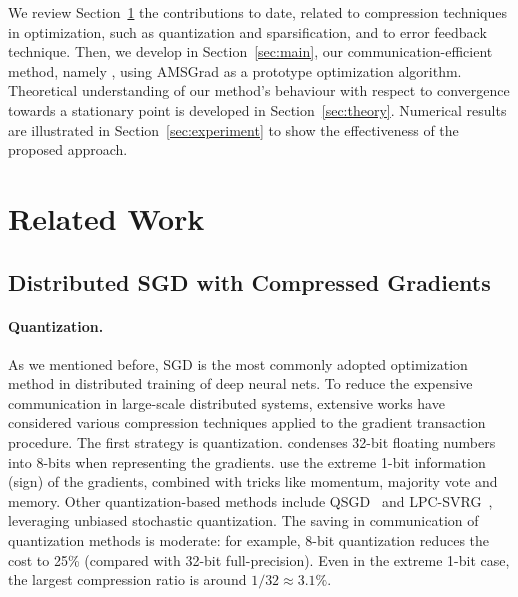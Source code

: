 \documentclass[11pt]{article}
\begin{document}
We review Section~\ref{sec:related} the contributions to date, related to compression techniques in optimization, such as quantization and sparsification, and to error feedback technique.
Then, we develop in Section~\ref{sec:main}, our communication-efficient method, namely \algo, using AMSGrad as a prototype optimization algorithm.
Theoretical understanding of our method's behaviour with respect to convergence towards a stationary point is developed in Section~\ref{sec:theory}.
Numerical results are illustrated in Section~\ref{sec:experiment} to show the effectiveness of the proposed approach.


\section{Related Work}\label{sec:related}

\subsection{Distributed SGD with Compressed Gradients}

\paragraph{Quantization.} As we mentioned before, SGD is the most commonly adopted optimization method in distributed training of deep neural nets. To reduce the expensive communication in large-scale distributed systems, extensive works have considered various compression techniques applied to the gradient transaction procedure. The first strategy is quantization. \cite{Proc:8-bit_ICLR16} condenses 32-bit floating numbers into 8-bits when representing the gradients. \cite{Proc:Seide14,bernstein2018signsgd,karimireddy2019error,Proc:Bernstein_ICLR19} use the extreme 1-bit information (sign) of the gradients, combined with tricks like momentum, majority vote and memory. Other quantization-based methods include QSGD~\cite{alistarh2017qsgd,Proc:Wu_ICML18,Proc:Zhang_ICML17} and LPC-SVRG~\cite{Proc:Yu_AISTATS19}, leveraging unbiased stochastic quantization. The saving in communication of quantization methods is moderate: for example, 8-bit quantization reduces the cost to 25\% (compared with 32-bit full-precision). Even in the extreme 1-bit case, the largest compression ratio is around $1/32\approx 3.1\%$. 
\end{document}

